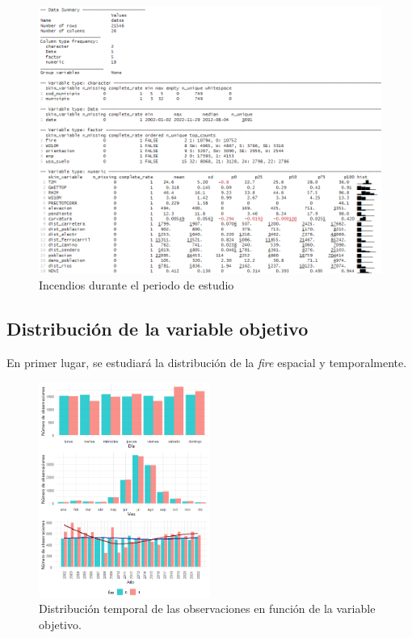 \documentclass[12pt,a4paper,]{book}
\numberwithin{dummy}{section}
\theoremstyle{ocrenumbox}
\theoremstyle{blacknumex}
\theoremstyle{blacknumbox}
\theoremstyle{ocrenum}
\theoremstyle{ocrenum}
\begin{document}
\begin{figure}[htb]
\centering
\includegraphics[width = \textwidth]{graficos/skim_datos.png}
\caption{Incendios durante el periodo de estudio}
\label{fig:skim_datos}
\end{figure}

\hypertarget{distribuciuxf3n-de-la-variable-objetivo}{%
\subsection{Distribución de la variable
objetivo}\label{distribuciuxf3n-de-la-variable-objetivo}}

En primer lugar, se estudiará la distribución de la \emph{fire} espacial
y temporalmente.

\begin{figure}[htb]
\centering
\includegraphics[width = 0.5\textwidth]{graficos/distribucion_temporal_fire.png}
\caption{Distribución temporal de las observaciones en función de la variable objetivo.}
\label{fig:dist_temp_fire}
\end{figure}
\end{document}
